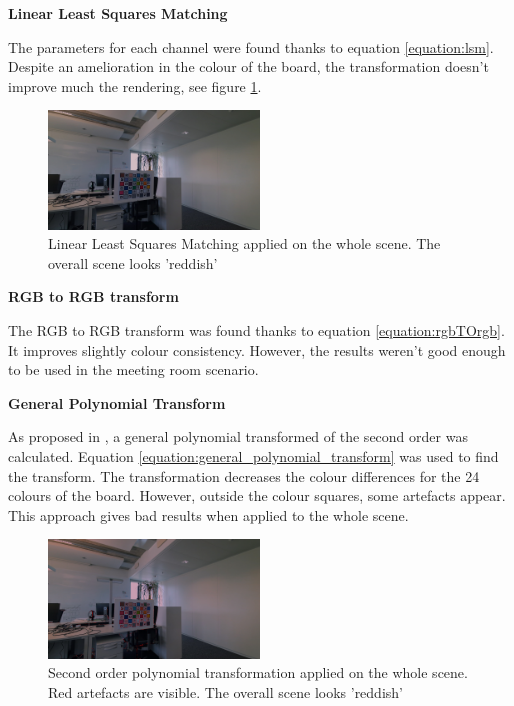\textbf{Linear Least Squares Matching}

The parameters for each channel were found thanks to equation \ref{equation:lsm}. Despite an amelioration in the colour of the board, the transformation doesn't improve much the rendering, see figure \ref{figure:sub_poly_1_2015}.

\begin{figure}[H]
    \centering
    \includegraphics[width=0.50\textwidth]{images/visual_enhancement/colour/sub_poly_1_2015.jpg}
    \caption{Linear Least Squares Matching applied on the whole scene. The overall scene looks 'reddish' }
    \label{figure:sub_poly_1_2015}
\end{figure}


\textbf{RGB to RGB transform}

The RGB to RGB transform was found thanks to equation \ref{equation:rgbTOrgb}. It improves slightly colour consistency. However, the results weren't good enough to be used in the meeting room scenario.

\textbf{General Polynomial Transform}

As proposed in \cite{ilie_ensuring_2005}, a general polynomial transformed of the second order was calculated. Equation \ref{equation:general_polynomial_transform} was used to find the transform. The transformation decreases the colour differences for the 24 colours of the board. However, outside the colour squares, some artefacts appear. This approach gives bad results when applied to the whole scene.

\begin{figure}[H]
    \centering
    \includegraphics[width=0.50\textwidth]{images/visual_enhancement/colour/sub_poly_2.jpg}
    \caption{Second order polynomial transformation applied on the whole scene. Red artefacts are visible. The overall scene looks 'reddish' }
    \label{figure:sub_poly_2}
\end{figure}

